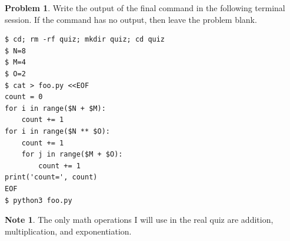 \documentclass[10pt]{article}
\theoremstyle{definition}
\newtheorem{problem}{Problem}
\newtheorem{note}{Note}
\begin{document}
\filbreak
\begin{problem}
    Write the output of the final command in the following terminal session.
    If the command has no output, then leave the problem blank.
\end{problem}
\begin{lstlisting}
$ cd; rm -rf quiz; mkdir quiz; cd quiz
$ N=8
$ M=4
$ O=2
$ cat > foo.py <<EOF
count = 0
for i in range($N + $M):
    count += 1
for i in range($N ** $O):
    count += 1
    for j in range($M + $O):
        count += 1
print('count=', count)
EOF
$ python3 foo.py
\end{lstlisting}
\vspace{0.4in}

\filbreak

\begin{note}
    The only math operations I will use in the real quiz are addition, multiplication, and exponentiation.
\end{note}
\end{document}
